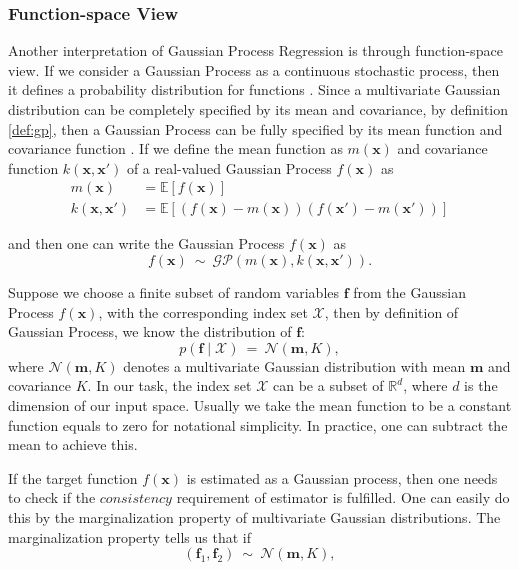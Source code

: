 \documentclass[11pt,a4paper]{article}
\theoremstyle{definition}
\newcommand{\GP}{\mathcal{GP}}
\newcommand{\EE}{\mathbb{E}}
\numberwithin{equation}{section}
\let\vec\mathbf
\begin{document}
	\subsubsection{Function-space View}
	Another interpretation of Gaussian Process Regression is through function-space view. If we consider a Gaussian Process as a continuous stochastic process, then it defines a probability distribution for functions \cite{Papoulis}. Since a multivariate Gaussian distribution can be completely specified by its mean and covariance, by definition \ref{def:gp}, then a Gaussian Process can be fully specified by its mean function and covariance function \cite{RandW}. If we define the mean function as $m(\vec{x})$ and covariance function $k(\vec{x},\vec{x'})$ of a real-valued Gaussian Process $f(\vec x)$ as
	\begin{equation} \label{}
	\begin{split}
	m(\vec{x}) & = \EE \left[ f(\vec x)\right] \\
	k(\vec{x},\vec{x'}) & = \EE \left[ \left( f(\vec x)-m(\vec{x})\right)\left( f(\vec x')-m(\vec{x'})\right)\right] 
	\end{split}
	\end{equation}
	
	and then one can write the Gaussian Process $f(\vec x)$ as
	\begin{equation} \label{}
	f(\vec x) \  \sim \ \GP\left(m(\vec{x}),k(\vec{x},\vec{x'})  \right).
	\end{equation}
	
	Suppose we choose a finite subset of random variables $\vec f$ from the Gaussian Process $f(\vec x)$, with the corresponding index set $\mathcal X$, then by definition of Gaussian Process, we know the distribution of $\vec f$:
	\begin{equation} \label{}
	p\left(\vec f \mid \mathcal X\right)\ =\ \mathcal N \left(\vec m , K \right),
	\end{equation}
	where $\mathcal N \left(\vec m , K \right)$ denotes a multivariate Gaussian distribution with mean $\vec m$ and covariance $K$. 
	In our task, the index set $\mathcal X$ can be a subset of $\mathbb R ^d$, where $d$ is the dimension of our input space. Usually we take the mean function to be a constant function equals to zero for notational simplicity. In practice, one can subtract the mean to achieve this. 
	
	If the target function $f(\vec x)$ is estimated as a Gaussian process, then one needs to check if the $consistency$ requirement of estimator is fulfilled. One can easily do this by the marginalization property of multivariate Gaussian distributions. The marginalization property tells us that if 
	\begin{equation*} \label{}
	\left(\vec f_1, \vec f_2\right)\ \sim \ \mathcal N \left(\vec m , K \right),
	\end{equation*}
	
\end{document}
